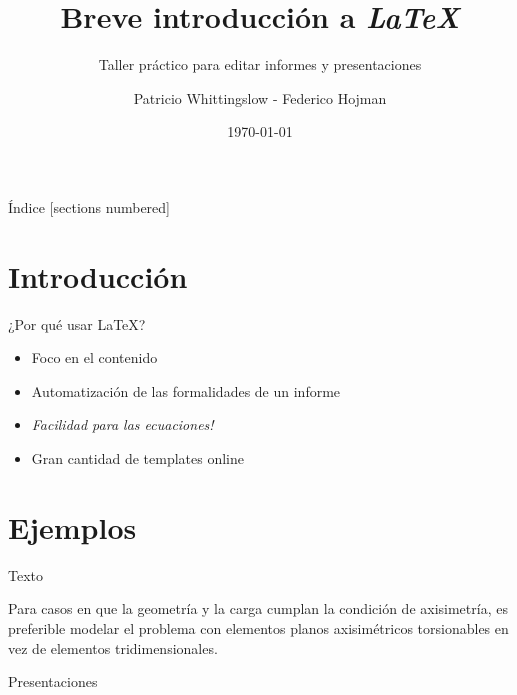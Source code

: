\documentclass[10pt]{beamer}
\title{Breve introducción a \emph{LaTeX}}
\subtitle{Taller práctico para editar informes y presentaciones}
\date{\today}
\author{Patricio Whittingslow - Federico Hojman}
\begin{document}
\maketitle

\begin{frame}{Índice}
  [sections numbered]
  \tableofcontents[hideallsubsections]
\end{frame}

\section{Introducción}

\begin{frame}[fragile]{¿Por qué usar LaTeX?}
\begin{itemize}
 \setlength\itemsep{1em}
	
\item Foco en el contenido
\item Automatización de las formalidades de un informe
\item \emph{Facilidad para las ecuaciones!}
\item Gran cantidad de templates online
\end{itemize}
\end{frame}

\section{Ejemplos}

\begin{frame}{Texto}


Para casos en que la geometría y la carga cumplan la condición de axisimetría, es preferible modelar el problema con elementos planos axisimétricos torsionables en vez de elementos tridimensionales.

\end{frame}
\begin{frame}{Presentaciones}
\vspace{0.5cm}

\end{frame}
\end{document}
